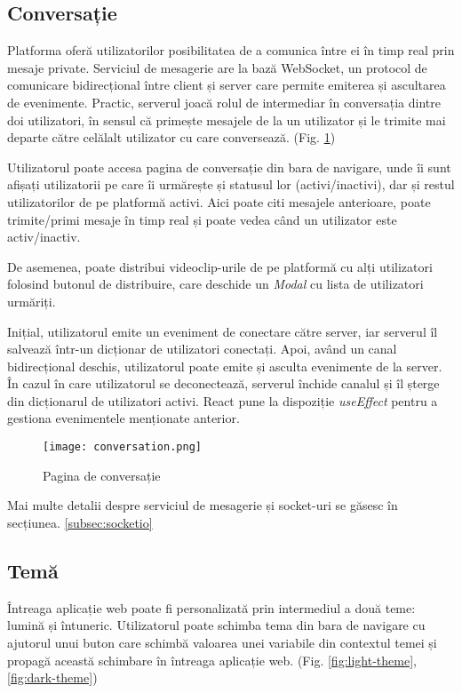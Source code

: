 \subsection{Conversație}
Platforma oferă utilizatorilor posibilitatea de a comunica între ei în timp real prin mesaje private.
Serviciul de mesagerie are la bază WebSocket, un protocol de comunicare bidirecțional între client
și server care permite emiterea și ascultarea de evenimente. Practic, serverul joacă rolul de intermediar
în conversația dintre doi utilizatori, în sensul că primește mesajele de la un utilizator și le trimite
mai departe către celălalt utilizator cu care conversează. (Fig. \ref{fig:conversation})
\par
Utilizatorul poate accesa pagina de conversație din bara de navigare, unde îi sunt afișați utilizatorii
pe care îi urmărește și statusul lor (activi/inactivi), dar și restul utilizatorilor de pe platformă activi.
Aici poate citi mesajele anterioare, poate trimite/primi mesaje în timp real și poate vedea când un utilizator
este activ/inactiv.
\par
De asemenea, poate distribui videoclip-urile de pe platformă cu alți utilizatori folosind butonul
de distribuire, care deschide un \textit{Modal} cu lista de utilizatori urmăriți.
\par
Inițial, utilizatorul emite un eveniment de conectare către server, iar serverul îl salvează într-un
dicționar de utilizatori conectați. Apoi, având un canal bidirecțional deschis, utilizatorul poate
emite și asculta evenimente de la server. În cazul în care utilizatorul se deconectează, serverul
închide canalul și îl șterge din dicționarul de utilizatori activi. React pune la dispoziție
\textit{useEffect} pentru a gestiona evenimentele menționate anterior.
\vspace{1em}
\begin{figure}[h]
    \centering
    \texttt{[image: conversation.png]}
    \caption{Pagina de conversație}
    \label{fig:conversation}
\end{figure}

\par
Mai multe detalii despre serviciul de mesagerie și socket-uri se găsesc în secțiunea. \ref{subsec:socketio}


\subsection{Temă}
Întreaga aplicație web poate fi personalizată prin intermediul a două teme: lumină și întuneric.
Utilizatorul poate schimba tema din bara de navigare cu ajutorul unui buton care schimbă
valoarea unei variabile din contextul temei și propagă această schimbare în întreaga
aplicație web. (Fig. \ref{fig:light-theme}, \ref{fig:dark-theme})


